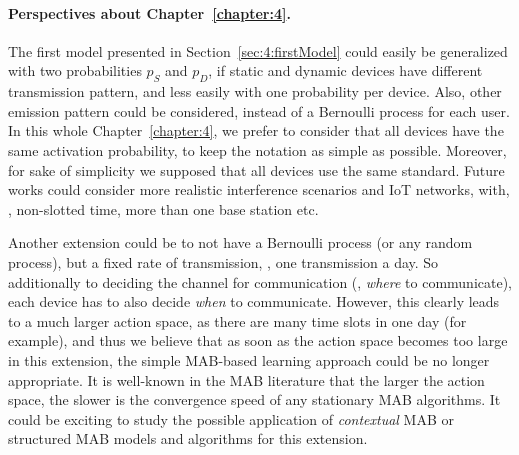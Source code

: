 \paragraph{Perspectives about \textbf{Chapter~\ref{chapter:4}}.}




The first model presented in Section~\ref{sec:4:firstModel} could easily be generalized with two probabilities $p_S$ and $p_D$, if static and dynamic devices have different transmission pattern, and less easily with one probability per device. Also, other emission pattern could be considered, instead of a Bernoulli process for each user.
In this whole Chapter~\ref{chapter:4}, we prefer to consider that all devices have the same activation probability, to keep the notation as simple as possible.
%
Moreover, for sake of simplicity we supposed that all devices use the same standard.
Future works could consider more realistic interference scenarios and IoT networks, with, \eg, non-slotted time, more than one base station etc.

Another extension could be to not have a Bernoulli process (or any random process), but a fixed rate of transmission, \eg, one transmission a day.
So additionally to deciding the channel for communication (\ie, \emph{where} to communicate), each device has to also decide \emph{when} to communicate.
However, this clearly leads to a much larger action space, as there are many time slots in one day (for example), and thus we believe that as soon as the action space becomes too large in this extension, the simple MAB-based learning approach could be no longer appropriate.
It is well-known in the MAB literature that the larger the action space, the slower is the convergence speed of any stationary MAB algorithms.
It could be exciting to study the possible application of \emph{contextual} MAB \cite{Li10,Luo18} or structured MAB \cite{Combes17} models and algorithms for this extension.


